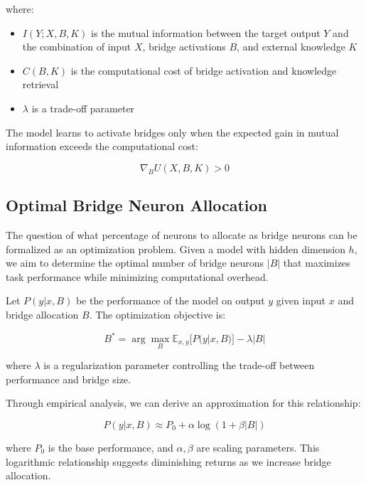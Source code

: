 \documentclass[9pt,a4paper,twocolumn,twoside]{tau-class/tau}
\begin{document}
    where:
    \begin{itemize}
        \item $I(Y; X, B, K)$ is the mutual information between the target output $Y$ and the combination of input $X$, bridge activations $B$, and external knowledge $K$
        \item $C(B, K)$ is the computational cost of bridge activation and knowledge retrieval
        \item $\lambda$ is a trade-off parameter
    \end{itemize}

    The model learns to activate bridges only when the expected gain in mutual information exceeds the computational cost:

    \begin{equation}
    \nabla_B U(X, B, K) > 0
    \end{equation}

\subsection{Optimal Bridge Neuron Allocation}

    The question of what percentage of neurons to allocate as bridge neurons can be formalized as an optimization problem. Given a model with hidden dimension $h$, we aim to determine the optimal number of bridge neurons $|B|$ that maximizes task performance while minimizing computational overhead.

    Let $P(y|x,B)$ be the performance of the model on output $y$ given input $x$ and bridge allocation $B$. The optimization objective is:

    \begin{equation}
    B^* = \arg\max_B \mathbb{E}_{x,y} [P(y|x,B)] - \lambda |B|
    \end{equation}

    where $\lambda$ is a regularization parameter controlling the trade-off between performance and bridge size.

    Through empirical analysis, we can derive an approximation for this relationship:

    \begin{equation}
    P(y|x,B) \approx P_0 + \alpha \log(1 + \beta |B|)
    \end{equation}

    where $P_0$ is the base performance, and $\alpha, \beta$ are scaling parameters. This logarithmic relationship suggests diminishing returns as we increase bridge allocation.
\end{document}
